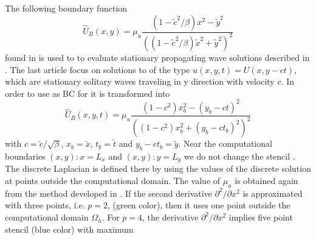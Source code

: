 \documentclass[11pt,a4paper,twoside]{article}
\begin{document}
The following boundary function
\begin{equation}\label{eqBCV}
\widehat U_B(x , y) = \mu_u \frac{ (1 - \tilde c^2/\beta) x^2 - \tilde y^2}{( (1 - \tilde c^2/\beta) \tilde x^2 + \tilde y^2)^2}
\end{equation}
found in \cite{BoundaryProblem} is used to to evaluate stationary propagating wave solutions described in \cite{EllipticProblem}. The last article focus on solutions to  of the type $u(x, y, t) = U(x, y - ct)$, which are stationary solitary waves traveling in y direction
with velocity c. In order to use  as BC for  it is transformed into
\begin{equation}\label{eqBCH}
\widehat U_B(x , y, t) = \mu_u \frac{ (1 - c^2) x_b^2 - (y_b-ct)^2}{( (1 - c^2) x_b^2 + (y_b-ct_b)^2)^2}
\end{equation}
with $c = \tilde c / \sqrt{\beta}$, $x_b = \tilde x$, $t_b = \tilde t$ and $y_b - ct_b = \tilde y$. 
Near the computational boundaries $(x,y):x=L_x$ and $(x,y):y=L_y$ we do not change the stencil . The discrete Laplacian
is defined there by using the values of the discrete solution  at points outside the computational domain. The value of $\mu_u$ is obtained again from the method developed in \cite{BoundaryProblem}. If the second derivative $\partial^2 / \partial x^2$ is approximated with three points, i.e. $p=2$, (green color), then it uses one point outside the computational domain $\Omega_h$. For $p=4$, the derivative $\partial^2 / \partial x^2$ implies five point stencil (blue color) with maximum
\end{document}
